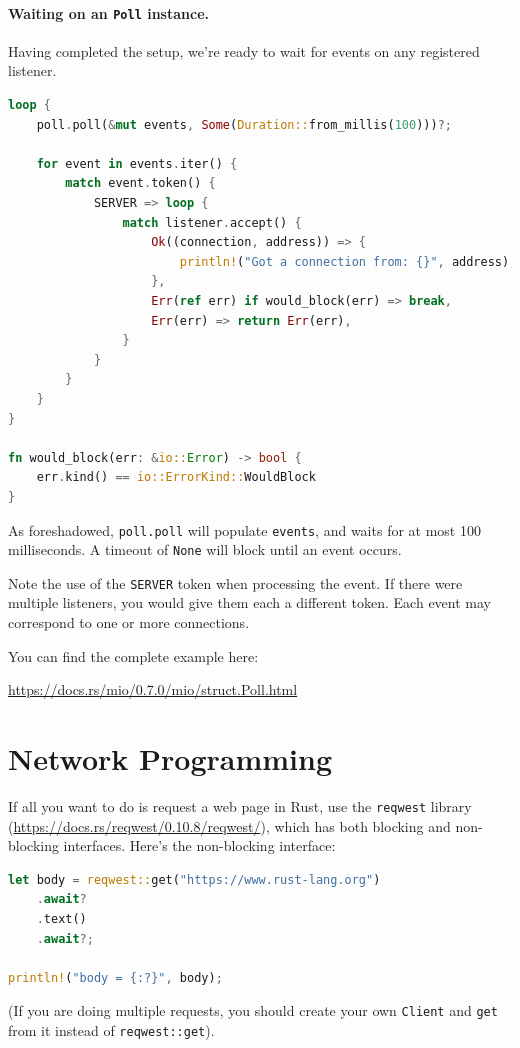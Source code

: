\documentclass[a4paper]{report}
\begin{document}
\paragraph{Waiting on an {\tt Poll} instance.} Having completed
the setup, we're ready to wait for events on any registered listener.
    \begin{lstlisting}[language=Rust]
loop {
    poll.poll(&mut events, Some(Duration::from_millis(100)))?;

    for event in events.iter() {
        match event.token() {
            SERVER => loop {
                match listener.accept() {
                    Ok((connection, address)) => {
                        println!("Got a connection from: {}", address);
                    },
                    Err(ref err) if would_block(err) => break,
                    Err(err) => return Err(err),
                }
            }
        }
    }
}

fn would_block(err: &io::Error) -> bool {
    err.kind() == io::ErrorKind::WouldBlock
}    \end{lstlisting}
As foreshadowed, \texttt{poll.poll} will populate \texttt{events}, and
waits for at most 100 milliseconds. A timeout of \texttt{None} will block
until an event occurs.

Note the use of the \texttt{SERVER} token when processing the event.
If there were multiple listeners, you would give them each a different
token. Each event may correspond to one or more connections.

You can find the complete example here:
\begin{center}
\url{https://docs.rs/mio/0.7.0/mio/struct.Poll.html}
\end{center}

\section*{Network Programming}
If all you want to do is request a web page in Rust, use
the \texttt{reqwest} library (\url{https://docs.rs/reqwest/0.10.8/reqwest/}),
which has both blocking and non-blocking interfaces. Here's the
non-blocking interface:
    \begin{lstlisting}[language=Rust]
let body = reqwest::get("https://www.rust-lang.org")
    .await?
    .text()
    .await?;

println!("body = {:?}", body);
\end{lstlisting}
(If you are doing multiple requests,
you should create your own \texttt{Client} and \texttt{get} from it instead of
\texttt{reqwest::get}).
\end{document}
